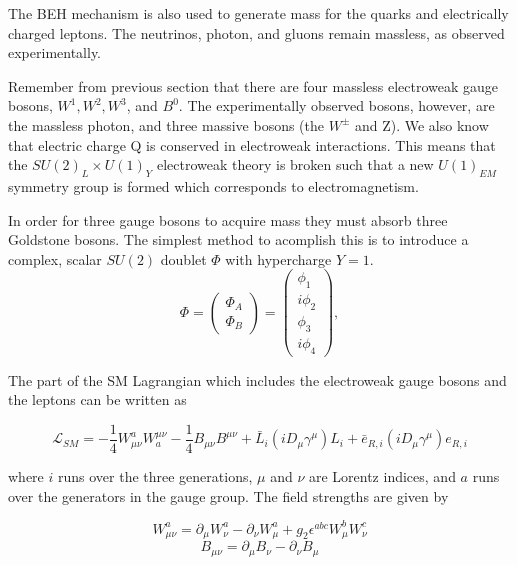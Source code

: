 The BEH mechanism is also used to generate mass for the quarks and electrically charged leptons. The neutrinos, photon, and gluons remain massless, as observed experimentally.
	
Remember from previous section that there are four massless electroweak gauge bosons, $W^{1}, W^{2}, W^{3}$, and $B^{0}$. The experimentally observed bosons, however, are the massless photon, and three massive bosons (the $W^{\pm}$ and Z). We also know that electric charge Q is conserved in electroweak interactions. This means that the $SU(2)_{L}\times U(1)_{Y}$ electroweak theory is broken such that a new $U(1)_{EM}$ symmetry group is formed which corresponds to electromagnetism. 
	
In order for three gauge bosons to acquire mass they must absorb three Goldstone bosons. The simplest method to acomplish this is to introduce a complex, scalar $SU(2)$ doublet $\Phi$ with hypercharge $Y=1$.
	\begin{equation}
		\Phi = \begin{pmatrix}
		\Phi_{A} \\
		\Phi_{B}
		\end{pmatrix} = \begin{pmatrix} \phi_{1} \\ i\phi_{2} \\ \phi_{3} \\ i\phi_{4} \end{pmatrix},
	\end{equation}

The part of the SM Lagrangian which includes the electroweak gauge bosons and the leptons can be written as

	\begin{equation}
	\mathcal{L}_{SM} = -\frac{1}{4}W_{\mu\nu}^{a}W_{a}^{\mu\nu} - \frac{1}{4}B_{\mu\nu}B^{\mu\nu} + \bar{L}_{i}(iD_{\mu}\gamma^{\mu})L_{i} + \bar{e}_{R,i}(iD_{\mu}\gamma^{\mu})e_{R,i}
	\end{equation}

where $i$ runs over the three generations, $\mu$ and $\nu$ are Lorentz indices, and $a$ runs over the generators in the gauge group. The field strengths are given by

	\begin{equation}
	W_{\mu\nu}^{a} = \partial_{\mu}W_{\nu}^{a} - \partial_{\nu}W_{\mu}^{a} + g_{2}\epsilon^{abc}W_{\mu}^{b}W_{\nu}^{c}
	\end{equation}
	\begin{equation}
	B_{\mu\nu} = \partial_{\mu}B_{\nu} - \partial_{\nu}B_{\mu}
	\end{equation}

